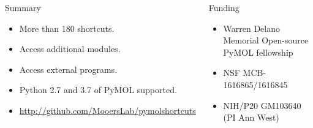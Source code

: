 \documentclass[final]{beamer}
\begin{document}
\begin{frame}
\begin{columns}[t,totalwidth=\textwidth]

\begin{block}{Summary}
\small{
\begin{itemize}
\item[\bullet]{More than 180 shortcuts.} 
\item[\bullet]{Access additional modules.}
\item[\bullet]{Access external programs.}
\item[\bullet]{Python 2.7 and 3.7 of PyMOL supported.}
\item[\bullet]{\url{http://github.com/MooersLab/pymolshortcuts}} 
\end{itemize}
\par}
\end{block}

\begin{block}{Funding}
\small{
\begin{itemize}
    \item Warren Delano Memorial Open-source PyMOL fellowship
    \item NSF MCB-1616865/1616845
    \item NIH/P20 GM103640 (PI Ann West)
\end{itemize}
\par}
\end{block}


\end{columns}
\end{frame}
\end{document}
